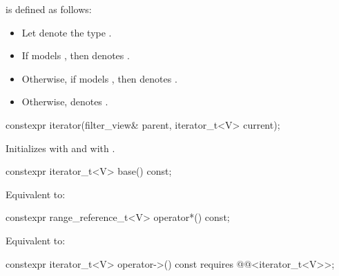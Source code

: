 \pnum
{} is defined as follows:
\begin{itemize}
\item Let  denote the type
.

\item If  models ,
then  denotes .

\item Otherwise, if   models ,
then  denotes .

\item Otherwise,  denotes .
\end{itemize}

%
\begin{itemdecl}
constexpr iterator(filter_view& parent, iterator_t<V> current);
\end{itemdecl}

\begin{itemdescr}
\pnum
\effects Initializes  with  and
 with .
\end{itemdescr}

%
\begin{itemdecl}
constexpr iterator_t<V> base() const;
\end{itemdecl}

\begin{itemdescr}
\pnum
\effects Equivalent to: 
\end{itemdescr}

%
\begin{itemdecl}
constexpr range_reference_t<V> operator*() const;
\end{itemdecl}

\begin{itemdescr}
\pnum
\effects Equivalent to: 
\end{itemdescr}

%
\begin{itemdecl}
constexpr iterator_t<V> operator->() const
  requires @@<iterator_t<V>>;
\end{itemdecl}

